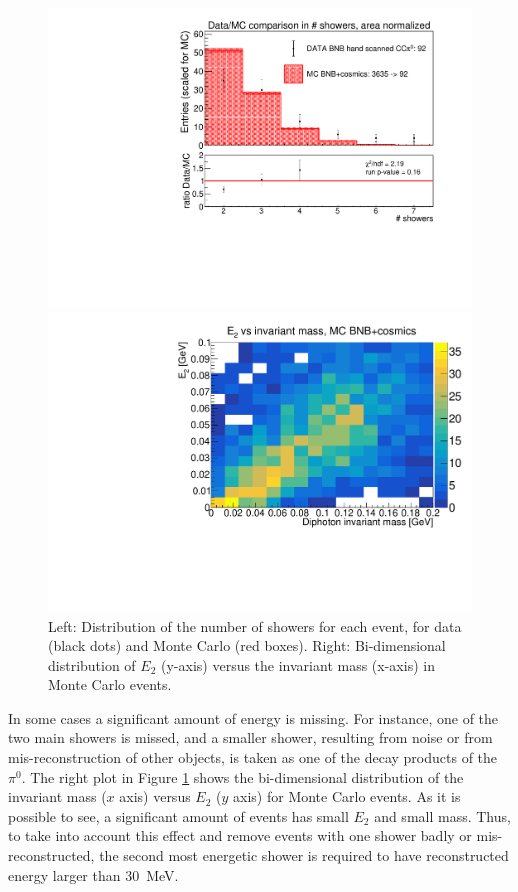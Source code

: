 \begin{figure}[!htbp]
\centering
\begin{minipage}{0.49\columnwidth}
  \includegraphics[width=0.99\columnwidth]{figures/n_showers_data_MC_comparison_mod.pdf}
\end{minipage}
\begin{minipage}{0.49\columnwidth} 
  \includegraphics[width=0.99\columnwidth]{figures/MC_mass_E2.pdf}
\end{minipage}
\caption{Left: Distribution of the number of showers for each event, for data (black dots) and Monte Carlo (red boxes). Right: Bi-dimensional distribution of $E_2$ (y-axis) versus the invariant mass (x-axis) in Monte Carlo events.}
\label{fig:mc_mass_e2}
\end{figure}

In some cases a significant amount of energy is missing. For instance, one of the two main showers is missed, and a smaller shower, resulting from noise or from mis-reconstruction of other objects, is taken as one of the decay products of the $\pi^0$. The right plot in Figure \ref{fig:mc_mass_e2} shows the bi-dimensional distribution of the invariant mass ($x$ axis) versus $E_2$ ($y$ axis) for Monte Carlo events. As it is possible to see, a significant amount of events has small $E_2$ and small mass. Thus, to take into account this effect and remove events with one shower badly or mis-reconstructed, the second most energetic shower is required to have reconstructed energy larger than 30~MeV.

